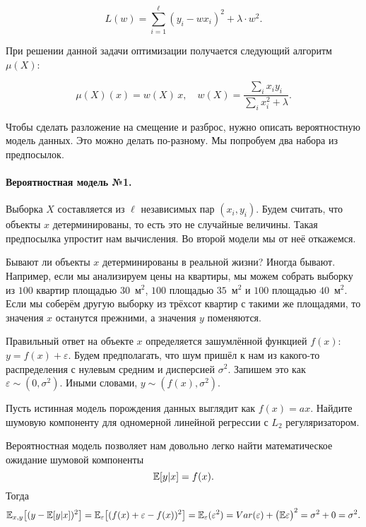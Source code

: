 \documentclass[12pt,fleqn]{article}
\begin{document}
\[
L(w) = \sum_{i=1}^\ell (y_i - w x_i)^2 + \lambda \cdot w^2. 
\]

При решении данной задачи оптимизации получается следующий алгоритм $\mu(X)$:

\[
\mu(X)(x) = w(X ) \,x, \quad w(X) = \frac{\sum_i x_i y_i}{\sum_i x_i^2 + \lambda}.
\]

Чтобы сделать разложение на смещение и разброс, нужно описать вероятностную модель данных. Это можно делать по-разному. Мы попробуем два набора из предпосылок.

\paragraph{Вероятностная модель №1.} 

Выборка $X$ составляется из $\ell$ независимых пар $(x_i, y_i)$. Будем считать, что объекты $x$ детерминированы, то есть это не случайные величины. Такая предпосылка упростит нам вычисления. Во второй модели мы от неё откажемся. 

Бывают ли объекты $x$ детерминированы в реальной жизни? Иногда бывают. Например, если мы анализируем цены на квартиры, мы можем собрать выборку из $100$ квартир площадью $30$~м$^2$, $100$ площадью $35$~м$^2$ и $100$ площадью $40$~м$^2.$ Если мы соберём другую выборку из трёхсот квартир с такими же площадями, то значения $x$ останутся прежними, а значения $y$ поменяются. 

Правильный ответ на объекте $x$ определяется зашумлённой функцией $f(x)$: $y = f(x) + \varepsilon$. Будем предполагать, что шум пришёл к нам из какого-то распределения с нулевым средним и дисперсией $\sigma^2$. Запишем это как $\varepsilon \sim (0, \sigma^2).$  Иными словами, $y \sim (f(x), \sigma^2).$ 

\begin{vkProblem}
Пусть истинная модель порождения данных выглядит как $f(x) = ax$. Найдите шумовую компоненту для одномерной линейной регрессии с $L_2$ регуляризатором. 
\end{vkProblem}
\begin{esSolution}
    Вероятностная модель позволяет нам довольно легко найти математическое ожидание шумовой компоненты
    \[
    \mathbb{E}[y|x] = f(x).
    \]  
    Тогда
    \[
    \mathbb{E}_{x, y}\bigl[(y - \mathbb{E}[y|x] )^2\bigr] = 
    \mathbb{E}_{\varepsilon}\bigl[(f(x) + \varepsilon - f(x) )^2\bigr] = 
    \mathbb{E}_{\varepsilon} (\varepsilon^2) = Var(\varepsilon) + \bigl(\mathbb{E}\varepsilon\bigr)^2 = \sigma^2 + 0 = \sigma^2.
    \]
\end{esSolution}
\end{document}
